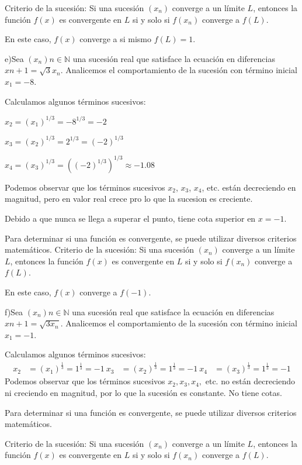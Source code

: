 \documentclass{article}
\begin{document}
Criterio de la sucesión: Si una sucesión $(x_n)$ converge a un límite $L$, entonces la función $f(x)$ es convergente en $L$ si y solo si $f(x_n)$ converge a $f(L)$.

En este caso, $f(x)$ converge a si mismo $f(L)= 1$.

e)Sea $(x_n){n \in \mathbb{N}}$ una sucesión real que satisface la ecuación en diferencias $x{n+1} = \sqrt{3}x_n$. Analicemos el comportamiento de la sucesión con término inicial $x_1 = -8$.

Calculamos algunos términos sucesivos:

$x_2 = (x_1)^{1/3} = -8^{1/3} = -2$

$x_3 = (x_2)^{1/3} = 2^{1/3} = (-2)^{1/3}$

$x_4 = (x_3)^{1/3} = ((-2)^{1/3})^{1/3} \approx -1.08$

Podemos observar que los términos sucesivos $x_2$, $x_3$, $x_4$, etc. están decreciendo en magnitud, pero en valor real crece pro lo que la sucesion es creciente.

Debido a que nunca se llega a superar el punto, tiene cota superior en $x = -1$.

Para determinar si una función es convergente, se puede utilizar diversos criterios matemáticos. Criterio de la sucesión: Si una sucesión $(x_n)$ converge a un límite $L$, entonces la función $f(x)$ es convergente en $L$ si y solo si $f(x_n)$ converge a $f(L)$.

En este caso, $f(x)$ converge a $f(-1)$.

f)Sea $(x_n){n \in \mathbb{N}}$ una sucesión real que satisface la ecuación en diferencias $x{n+1} = \sqrt{3x_n}$. Analicemos el comportamiento de la sucesión con término inicial $x_1 = -1$.

Calculamos algunos términos sucesivos:
\begin{align*}
x_2 &= (x_1)^{\frac{1}{3}} = 1^{\frac{1}{3}} = -1 \
x_3 &= (x_2)^{\frac{1}{3}} = 1^{\frac{1}{3}} = -1 \
x_4 &= (x_3)^{\frac{1}{3}} = 1^{\frac{1}{3}} = -1
\end{align*}
Podemos observar que los términos sucesivos $x_2, x_3, x_4,$ etc. no están decreciendo ni creciendo en magnitud, por lo que la sucesión es constante. No tiene cotas.

Para determinar si una función es convergente, se puede utilizar diversos criterios matemáticos.

Criterio de la sucesión: Si una sucesión $(x_n)$ converge a un límite $L$, entonces la función $f(x)$ es convergente en $L$ si y solo si $f(x_n)$ converge a $f(L)$.
\end{document}
